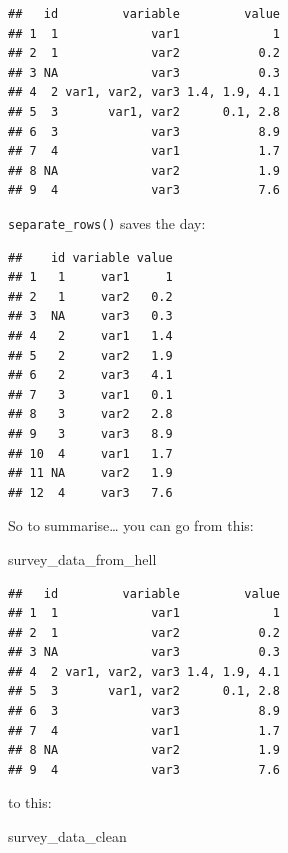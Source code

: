 \documentclass[]{gitbook}
\newenvironment{Shaded}{\begin{snugshade}}{\end{snugshade}}
\newcommand{\KeywordTok}[1]{\textcolor[rgb]{0.13,0.29,0.53}{\textbf{#1}}}
\newcommand{\NormalTok}[1]{#1}
\newcommand{\OperatorTok}[1]{\textcolor[rgb]{0.81,0.36,0.00}{\textbf{#1}}}
\newcommand{\StringTok}[1]{\textcolor[rgb]{0.31,0.60,0.02}{#1}}
\theoremstyle{definition}
\theoremstyle{definition}
\theoremstyle{definition}
\theoremstyle{remark}
\begin{document}
\begin{verbatim}
##   id         variable         value
## 1  1             var1             1
## 2  1             var2           0.2
## 3 NA             var3           0.3
## 4  2 var1, var2, var3 1.4, 1.9, 4.1
## 5  3       var1, var2      0.1, 2.8
## 6  3             var3           8.9
## 7  4             var1           1.7
## 8 NA             var2           1.9
## 9  4             var3           7.6
\end{verbatim}

\texttt{separate\_rows()} saves the day:

\begin{Shaded}
\end{Shaded}

\begin{verbatim}
##    id variable value
## 1   1     var1     1
## 2   1     var2   0.2
## 3  NA     var3   0.3
## 4   2     var1   1.4
## 5   2     var2   1.9
## 6   2     var3   4.1
## 7   3     var1   0.1
## 8   3     var2   2.8
## 9   3     var3   8.9
## 10  4     var1   1.7
## 11 NA     var2   1.9
## 12  4     var3   7.6
\end{verbatim}

So to summarise\ldots{} you can go from this:

\begin{Shaded}
\begin{Highlighting}[]
\NormalTok{survey_data_from_hell}
\end{Highlighting}
\end{Shaded}

\begin{verbatim}
##   id         variable         value
## 1  1             var1             1
## 2  1             var2           0.2
## 3 NA             var3           0.3
## 4  2 var1, var2, var3 1.4, 1.9, 4.1
## 5  3       var1, var2      0.1, 2.8
## 6  3             var3           8.9
## 7  4             var1           1.7
## 8 NA             var2           1.9
## 9  4             var3           7.6
\end{verbatim}

to this:

\begin{Shaded}
\begin{Highlighting}[]
\NormalTok{survey_data_clean}
\end{Highlighting}
\end{Shaded}
\end{document}

